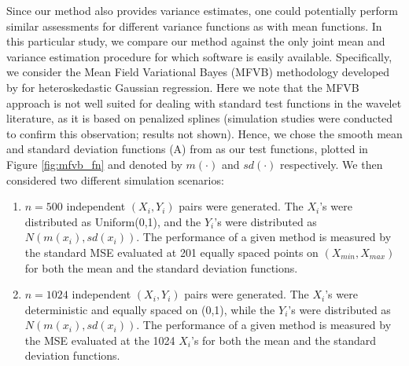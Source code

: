 \documentclass[12pt]{article}
\begin{document}
Since our method also provides variance estimates, one could potentially perform similar assessments for different variance functions as with mean functions. In this particular study, we compare our method against the only joint mean and variance estimation procedure for which software is easily available. Specifically, we consider the Mean Field Variational Bayes (MFVB) methodology developed by \cite{Menictas2015Variational} for heteroskedastic Gaussian regression. Here we note that the MFVB approach is not well suited for dealing with standard test functions in the wavelet literature, as it is based on penalized splines (simulation studies were conducted to confirm this observation; results not shown). Hence, we chose the smooth mean and standard deviation functions (A) from \cite{Menictas2015Variational} as our test functions, plotted in Figure \ref{fig:mfvb_fn} and denoted by $m(\cdot)$ and $sd(\cdot)$ respectively. We then considered two different simulation scenarios:
\begin{enumerate}
\item $n=500$ independent $(X_i,Y_i)$ pairs were generated. The $X_i$'s were distributed as Uniform(0,1), and the $Y_i$'s were distributed as $N(m(x_i),sd(x_i))$. The performance of a given method is measured by the standard MSE evaluated at 201 equally spaced points on $(X_{min},X_{max})$ for both the mean and the standard deviation functions.
\item $n=1024$ independent $(X_i,Y_i)$ pairs were generated. The $X_i$'s were deterministic and equally spaced on (0,1), while the $Y_i$'s were distributed as $N(m(x_i),sd(x_i))$. The performance of a given method is measured by the MSE evaluated at the 1024 $X_i$'s for both the mean and the standard deviation functions.
\end{enumerate}
\end{document}
